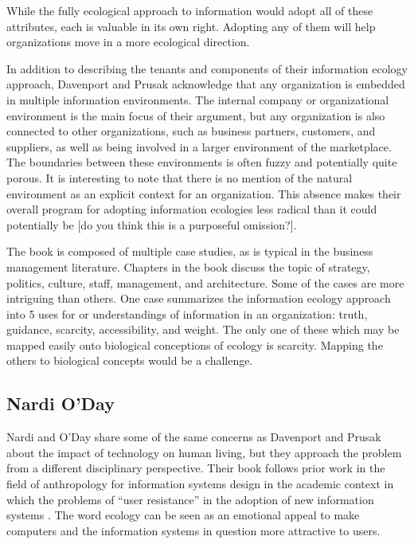 While the fully ecological approach to information would adopt all of these attributes, each is valuable in its own right. Adopting any of them will help organizations move in a more ecological direction.

In addition to describing the tenants and components of their information ecology approach, Davenport and Prusak acknowledge that any organization is embedded in multiple information environments. The internal company or organizational environment is the main focus of their argument, but any organization is also connected to other organizations, such as business partners, customers, and suppliers, as well as being involved in a larger environment of the marketplace. The boundaries between these environments is often fuzzy and potentially quite porous. It is interesting to note that there is no mention of the natural environment as an explicit context for an organization. This absence makes their overall program for adopting information ecologies less radical than it could potentially be [do you think this is a purposeful omission?].

The book is composed of multiple case studies, as is typical in the business management literature. Chapters in the book discuss the topic of strategy, politics, culture, staff, management, and architecture. Some of the cases are more intriguing than others. One case summarizes the information ecology approach into 5 uses for or understandings of information in an organization: truth, guidance, scarcity, accessibility, and weight. The only one of these which may be mapped easily onto biological conceptions of ecology is scarcity. Mapping the others to biological concepts would be a challenge.

\subsection{Nardi O'Day}

Nardi and O'Day share some of the same concerns as Davenport and Prusak about the impact of technology on human living, but they approach the problem from a different disciplinary perspective. Their book follows prior work in the field of anthropology for information systems design in the academic context in which the problems of ``user resistance'' in the adoption of new information systems \citep{star_1996}. The word ecology can be seen as an emotional appeal to make computers and the information systems in question more attractive to users.

